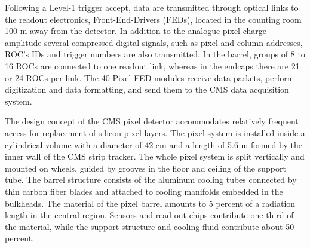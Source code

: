 Following a Level-1 trigger accept, data are transmitted through optical links to the readout 
electronics, Front-End-Drivers (FEDs), located in the counting room 100 m away from the detector. 
In addition to the analogue pixel-charge amplitude several compressed digital signals, such 
as pixel and column addresses, ROC's IDs and trigger numbers are also transmitted. 
In the barrel, groups of 8 to 16 ROCs are connected to one readout link, whereas in the endcaps
there are 21 or 24 ROCs per link. 
The 40 Pixel FED modules receive data packets, perform digitization and data formatting, 
and send them to the CMS data acquisition system.

The design concept of the CMS pixel detector accommodates relatively frequent access for 
replacement of silicon pixel layers.
The pixel system is installed inside a cylindrical volume with a diameter of 42 cm and 
a length of 5.6 m formed by the inner wall of the CMS strip tracker. The whole pixel 
system is split vertically and mounted on wheels. guided by grooves in the floor and ceiling 
of the support tube. The barrel structure consists of the aluminum cooling tubes connected
by thin carbon fiber blades and attached to cooling manifolds embedded in the bulkheads.
The material of the pixel barrel amounts to 5 percent of a radiation length in the central region.
Sensors and read-out chips contribute one third of the material, while the support structure
and cooling fluid contribute about 50 percent.


